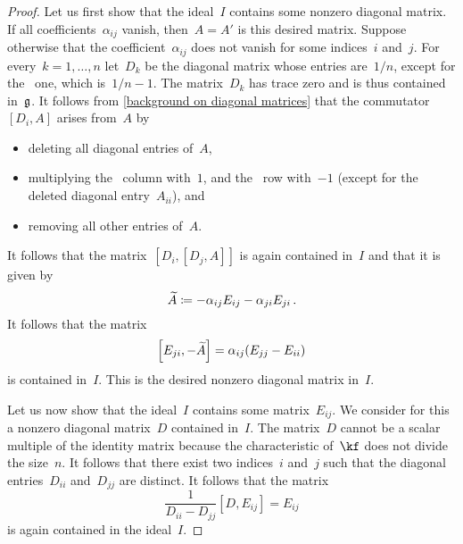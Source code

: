 \begin{proof}
	Let us first show that the ideal~$I$ contains some nonzero diagonal matrix.
	If all coefficients~$\alpha_{ij}$ vanish, then~$A = A'$ is this desired matrix.
	Suppose otherwise that the coefficient~$\alpha_{ij}$ does not vanish for some indices~$i$ and~$j$.
	For every~$k = 1, \dotsc, n$ let~$D_k$ be the diagonal matrix whose entries are~$1/n$, except for the~ one, which is~$1/n - 1$.
	The matrix~$D_k$ has trace zero and is thus contained in~$\mathfrak{g}$.
	It follows from \cref{background on diagonal matrices} that the commutator~$[D_i, A]$ arises from~$A$ by
	\begin{itemize}
		\item
			deleting all diagonal entries of~$A$,
		\item
			multiplying the~ column with~$1$, and the~ row with~$-1$ (except for the deleted diagonal entry~$A_{ii}$), and
		\item
		  removing all other entries of~$A$.
	\end{itemize}
	It follows that the matrix~$[D_i, [D_j, A]]$ is again contained in~$I$ and that it is given by
	\[
		\widetilde{A}
		\coloneqq
		- \alpha_{ij} E_{ij} - \alpha_{ji} E_{ji} \,.
	\]
	It follows that the matrix
	\[
		\Bigl[ E_{ji}, - \widetilde{A} \Bigr]
		=
		\alpha_{ij} ( E_{jj} - E_{ii} )
	\]
	is contained in~$I$.
	This is the desired nonzero diagonal matrix in~$I$.

	Let us now show that the ideal~$I$ contains some matrix~$E_{ij}$.
	We consider for this a nonzero diagonal matrix~$D$ contained in~$I$.
	The matrix~$D$ cannot be a scalar multiple of the identity matrix because the characteristic of~$\kf$ does not divide the size~$n$.
	It follows that there exist two indices~$i$ and~$j$ such that the diagonal entries~$D_{ii}$ and~$D_{jj}$ are distinct.
	It follows that the matrix
	\[
		\frac{1}{D_{ii} - D_{jj}} [D, E_{ij}]
		=
		E_{ij}
	\]
	is again contained in the ideal~$I$.


\end{proof}
